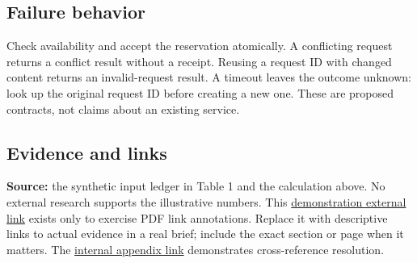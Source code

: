 \documentclass[11pt,letterpaper]{article}
\begin{document}
\subsection*{Failure behavior}
Check availability and accept the reservation atomically. A conflicting
request returns a conflict result without a receipt. Reusing a request ID
with changed content returns an invalid-request result. A timeout leaves
the outcome unknown: look up the original request ID before creating a
new one. These are proposed contracts, not claims about an existing service.

\subsection*{Evidence and links}
\textbf{Source:} the synthetic input ledger in Table 1 and the calculation
above. No external research supports the illustrative numbers.
This \href{https://example.org}{demonstration external link} exists only
to exercise PDF link annotations. Replace it with descriptive links to
actual evidence in a real brief; include the exact section or page when
it matters. The \hyperref[app:inputs]{internal appendix link} demonstrates
cross-reference resolution.
\end{document}
